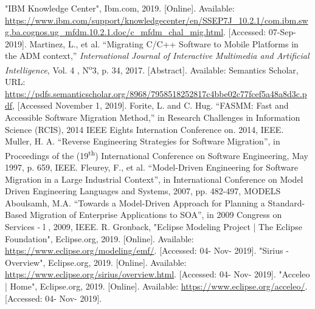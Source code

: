 \documentclass[conference]{IEEEtran}
\begin{document}
\begin{thebibliography}{00}
 "IBM Knowledge Center", Ibm.com, 2019. [Online]. Available: \url{https://www.ibm.com/support/knowledgecenter/en/SSEP7J_10.2.1/com.ibm.swg.ba.cognos.ug_mfdm.10.2.1.doc/c_mfdm_chal_mig.html}. [Accessed: 07-Sep-2019].
 Martinez, L., et al. ``Migrating C/C++ Software to Mobile Platforms in the ADM context,'' \textit{International Journal of Interactive Multimedia and Artificial Intelligence}, Vol. 4 , N\textsuperscript{o}3, p. 34, 2017. [Abstract]. Available: Semantics Scholar, URL: \url{https://pdfs.semanticscholar.org/8968/7958518252817c4bbe02c77fcef5a48a8d3c.pdf}, [Accessed November 1, 2019].
 Forite, L. and C. Hug. ``FASMM: Fast and Accessible Software Migration Method,'' in Research Challenges in Information Science (RCIS), 2014 IEEE Eights Internation Conference on. 2014, IEEE.
 Muller, H. A. ``Reverse Engineering Strategies for Software Migration'', in Proceedings of the (19\textsuperscript{th}) International Conference on Software Engineering, May 1997, p. 659, IEEE.
 Fleurey, F., et al. ``Model-Driven Engineering for Software Migration in a Large Industrial Context'', in International Conference on Model Driven Engineering Languages and Systems, 2007, pp. 482-497, MODELS
 Aboulsamh, M.A. ``Towards a Model-Driven Approach for Planning a Standard-Based Migration of Enterprise Applications to SOA'', in 2009 Congress on Services - l , 2009, IEEE.
 R. Gronback, "Eclipse Modeling Project | The Eclipse Foundation", Eclipse.org, 2019. [Online]. Available: \url{https://www.eclipse.org/modeling/emf/}. [Accessed: 04- Nov- 2019].
 "Sirius - Overview", Eclipse.org, 2019. [Online]. Available: \url{https://www.eclipse.org/sirius/overview.html}. [Accessed: 04- Nov- 2019].
 "Acceleo | Home", Eclipse.org, 2019. [Online]. Available: \url{https://www.eclipse.org/acceleo/}. [Accessed: 04- Nov- 2019].

\end{thebibliography}
\vspace{12pt}
\color{red}
\end{document}
